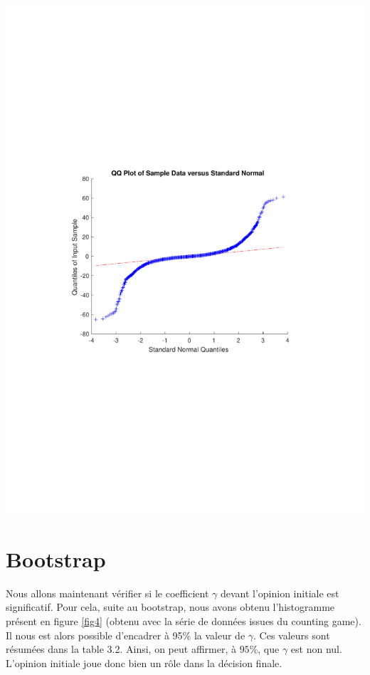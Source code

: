 \documentclass{scrreprt}
\begin{document}
\begin{center}
\includegraphics[trim = 3cm 9cm 3cm 9cm, clip]{qqplot.pdf}
\label{fig3.5}
\end{center}

 

\section{Bootstrap}

Nous allons maintenant vérifier si le coefficient $\gamma$ devant l'opinion initiale est significatif. Pour cela, suite au bootstrap, nous avons obtenu l'histogramme présent en figure \ref{fig4} (obtenu avec la série de données issues du counting game). Il nous est alors possible d'encadrer à 95\% la valeur de $\gamma$. Ces valeurs sont résumées dans la table 3.2. Ainsi, on peut affirmer, à $95\%$, que $\gamma$ est non nul. L'opinion initiale joue donc bien un rôle dans la décision finale.
\end{document}
